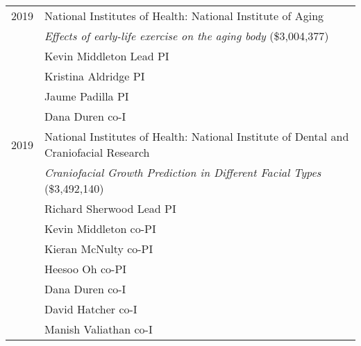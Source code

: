 \begin{longtable}{@{}lX@{}}
    2019 & National Institutes of Health: National Institute of Aging\\
         & \emph{Effects of early-life exercise on the aging body} (\$3,004,377)\\
         & Kevin Middleton Lead PI\\
         & Kristina Aldridge PI\\
         & Jaume Padilla PI\\
         & Dana Duren co-I\\[0.5pc]
    2019 & National Institutes of Health: National Institute of Dental and Craniofacial Research\\
         & \emph{Craniofacial Growth Prediction in Different Facial Types} (\$3,492,140)\\
         & Richard Sherwood Lead PI\\
         & Kevin Middleton co-PI\\
         & Kieran McNulty co-PI\\
         & Heesoo Oh co-PI\\
         & Dana Duren co-I\\
         & David Hatcher co-I\\
         & Manish Valiathan co-I\\[0.5pc]
\end{longtable}
